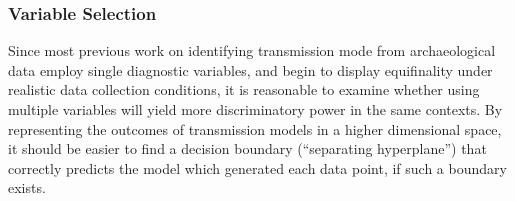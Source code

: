 \subsubsection{Variable Selection}\label{variable-selection}

Since most previous work on identifying transmission mode from archaeological data employ single diagnostic variables, and begin to display equifinality under realistic data collection conditions, it is reasonable to examine whether using multiple variables will yield more discriminatory power in the same contexts.  By representing the outcomes of transmission models in a higher dimensional space, it should be easier to find a decision boundary (``separating hyperplane'') that correctly predicts the model which generated each data point, if such a boundary exists.  


